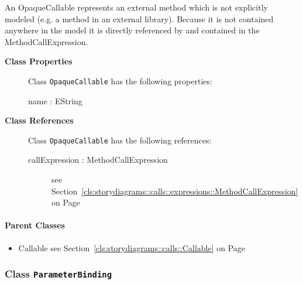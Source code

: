 	
			
An OpaqueCallable represents an external method which is not explicitly modeled (e.g. a method in an external library). Because it is not contained anywhere in the model it is directly referenced by and contained in the MethodCallExpression.	
			
	
		
	


\begin{description}

	\item[\textbf{Class Properties}] Class \texttt{OpaqueCallable} has the following properties:
	\begin{description}
\item[name : EString 	]

\hspace{\fill}
\nopagebreak


	
	\end{description}
	
	\item[\textbf{Class References}] Class \texttt{OpaqueCallable} has the following references:
	\begin{description}
\item[callExpression : MethodCallExpression 	]
see Section~\ref{cls:storydiagrams::calls::expressions::MethodCallExpression} on Page~\pageref{cls:storydiagrams::calls::expressions::MethodCallExpression}
\hspace{\fill}
\nopagebreak


	
	\end{description}
	

\end{description}

\paragraph{Parent Classes}
\begin{itemize}
\item Callable see Section~\ref{cls:storydiagrams::calls::Callable} on Page~\pageref{cls:storydiagrams::calls::Callable}\end{itemize}
\subsubsection{\Large{Class \bfseries \texttt{ParameterBinding}\normalfont}}
\label{cls:storydiagrams::calls::ParameterBinding} 
